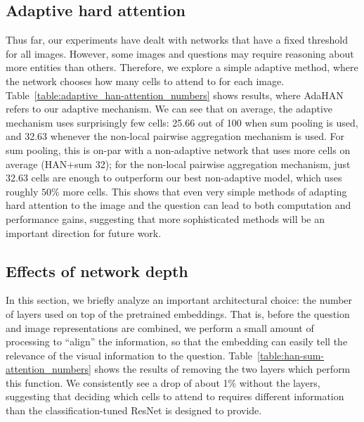 \subsection{Adaptive hard attention}
Thus far, our experiments have dealt with networks that have a fixed threshold for all images.  
However, some images and questions may require reasoning about more entities than others.
Therefore, we explore a simple adaptive method, where the network chooses how many cells to attend to for each image.
Table~\ref{table:adaptive_han-attention_numbers} shows results, where AdaHAN refers to our adaptive mechanism.  We can see that on average, the adaptive mechanism uses surprisingly few cells: 25.66 out of 100 when sum pooling is used, and 32.63 whenever the non-local pairwise aggregation mechanism is used.
For sum pooling, this is on-par with a non-adaptive network that uses more cells on average (HAN+sum 32); for the non-local pairwise aggregation mechanism, just 32.63 cells are enough to outperform our best non-adaptive model, which uses roughly $50\%$ more cells.
This shows that even very simple methods of adapting hard attention to the image and the question can lead to both computation and performance gains, suggesting that more sophisticated methods will be an important direction for future work.

\subsection{Effects of network depth}
In this section, we briefly analyze an important architectural choice: the number of layers used on top of the pretrained embeddings.  
That is, before the question and image representations are combined, we perform a small amount of processing to ``align'' the information, so that the embedding can easily tell the relevance of the visual information to the question.
Table~\ref{table:han-sum-attention_numbers} shows the results of removing the two layers which perform this function.  
We consistently see a drop of about 1\% without the layers, suggesting that deciding which cells to attend to requires different information than the classification-tuned ResNet is designed to provide.

